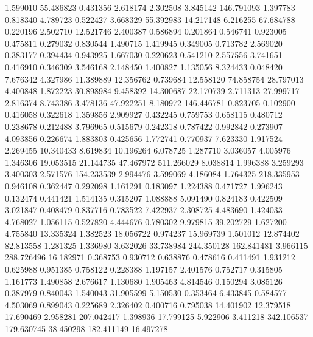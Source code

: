 1.599010
55.486823
0.431356
2.618174
2.302508
3.845142
146.791093
1.397783
0.818340
4.789723
0.522427
3.668329
55.392983
14.217148
6.216255
67.684788
0.220196
2.502710
12.521746
2.400387
0.586894
0.201864
0.546741
0.923005
0.475811
0.279032
0.830544
1.490715
1.419945
0.349005
0.713782
2.569020
0.383177
0.394434
0.943925
1.667030
0.220623
0.541210
2.557556
3.741651
0.416910
0.346309
3.546168
2.148450
1.400827
1.135056
8.324433
0.048420
7.676342
4.327986
11.389889
12.356762
0.739684
12.558120
74.858754
28.797013
4.400848
1.872223
30.898984
9.458392
14.300687
22.170739
2.711313
27.999717
2.816374
8.743386
3.478136
47.922251
8.180972
146.446781
0.823705
0.102900
0.416058
0.322618
1.359856
2.909927
0.432245
0.759753
0.658115
0.480712
0.238678
0.212488
3.796965
0.515679
0.242318
0.787422
0.992842
0.273907
4.093856
0.226674
1.883803
0.425656
1.772741
0.770937
7.623330
1.917524
2.269455
10.340433
8.619834
10.196264
6.078725
1.287710
3.036057
4.005976
1.346306
19.053515
21.144735
47.467972
511.266029
8.038814
1.996388
3.259293
3.400303
2.571576
154.233539
2.994476
3.599069
4.186084
1.764325
218.335953
0.946108
0.362447
0.292098
1.161291
0.183097
1.224388
0.471727
1.996243
0.132474
0.441421
1.514135
0.315207
1.088888
5.091490
0.824183
0.422509
3.021847
0.408479
0.837716
0.783522
7.422937
2.308725
4.483690
1.424033
4.768027
1.056115
0.527820
4.444676
0.780302
9.979815
39.202729
1.627200
4.755840
13.335324
1.382523
18.056722
0.974237
15.969739
1.501012
12.874402
82.813558
1.281325
1.336980
3.632026
33.738984
244.350128
162.841481
3.966115
288.726496
16.182971
0.368753
0.930712
0.638876
0.478616
0.411491
1.931212
0.625988
0.951385
0.758122
0.228388
1.197157
2.401576
0.752717
0.315805
1.161773
1.490858
2.676617
1.130680
1.905463
4.814546
0.150294
3.085126
0.387979
0.840043
1.540043
31.905599
5.150530
0.353464
6.433845
0.584577
4.503069
0.899043
0.225689
2.326402
0.400716
0.795038
14.401902
12.379518
17.690469
2.958281
207.042417
1.398936
17.799125
5.922906
3.411218
342.106537
179.630745
38.450298
182.411149
16.497278
